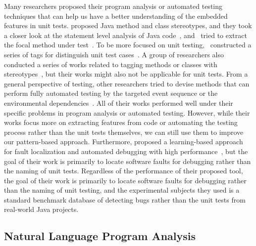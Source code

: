 Many researchers proposed their program analysis or automated testing techniques that can help us have a better understanding of the embedded features in unit tests. 
%
\citeauthor{moreno2012jstereocode} proposed Java method and class stereotypes, and they took a closer look at the statement level analysis of Java code~\cite{moreno2012jstereocode}, and~\citeauthor{ghafari2015automatically} tried to extract the focal method under test~\cite{ghafari2015automatically}.
%
To be more focused on unit testing,~\citeauthor{li2018aiding} constructed a series of tags for distinguish unit test cases~\cite{li2018aiding}.
%
A group of researchers also conducted a series of works related to tagging methods or classes with stereotypes~\cite{dragan2006reverse,dragan2010automatic,dragan2011emergent}, but their works might also not be applicable for unit tests.
%
From a general perspective of testing, other researchers tried to devise methods that can perform fully automated testing by the targeted event sequence or the environmental dependencies~\cite{jensen2013automated,arcuri2014automated}.
%
All of their works performed well under their specific problems in program analysis or automated testing. 
However, while their works focus more on extracting features from code or automating the testing process rather than the unit tests themselves, we can still use them to improve our pattern-based approach.
%
Furthermore, \citeauthor{li2019deepfl} proposed a learning-based approach for fault localization and automated debugging with high performance~\cite{li2019deepfl}, but the goal of their work is primarily to locate software faults for debugging rather than the naming of unit tests. 
%
Regardless of the performance of their proposed tool, the goal of their work is primarily to locate software faults for debugging rather than the naming of unit testing, and the experimental subjects they used is a standard benchmark database of detecting bugs rather than the unit tests from real-world Java projects.


\subsection{Natural Language Program Analysis}

